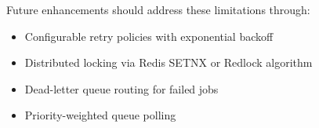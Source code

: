Future enhancements should address these limitations through:
\begin{itemize}
    \item Configurable retry policies with exponential backoff
    \item Distributed locking via Redis SETNX or Redlock algorithm
    \item Dead-letter queue routing for failed jobs
    \item Priority-weighted queue polling
\end{itemize}

